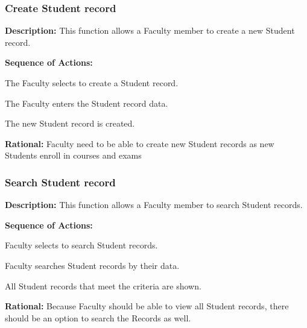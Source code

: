    \subsubsection{\large Create Student record} 
   \begin{boxed} %
      \textbf{Description:}
      {\small This function allows a Faculty member to create a new Student
         record. }
         
         \textbf{Sequence of Actions:}
         \begin{enumerate}
               {\small
            \item The Faculty selects to create a Student record.
            \item The Faculty enters the Student record data.
            \item The new Student record is created.}
      \end{enumerate}

         \textbf{Rational:}
         {\small Faculty need to be able to create new Student records as new Students
         enroll in courses and exams}
   \end{boxed} %

   \subsubsection{\large Search Student record} 
   \begin{boxed} %
      \textbf{Description:}
      {\small This function allows a Faculty member to search Student records.}
         
         \textbf{Sequence of Actions:}
         \begin{enumerate}
               {\small
            \item Faculty selects to search Student records.
            \item Faculty searches Student records by their data.
            \item All Student records that meet the criteria are shown.}
      \end{enumerate}

         \textbf{Rational:}
         {\small Because Faculty should be able to view all Student records, there
         should be an option to search the Records as well.}
   \end{boxed} %

